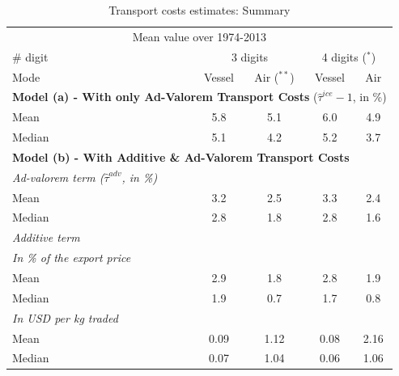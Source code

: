 \documentclass[a4paper,11pt]{article}
\begin{document}
\begin{table}[htbp]
  \centering
  \footnotesize{
  \caption{Transport costs estimates: Summary \label{tab:summary_results}}
  \begin{center}
    \begin{tabular}{l|cc|cc}
      \hline \hline
    \multicolumn{5}{c}{Mean value over 1974-2013}   \\
    \# digit & \multicolumn{2}{c}{3 digits} & \multicolumn{2}{c}{4 digits ($^\ast$)} \\ \hline
    Mode  & Vessel & Air ($^{\ast \ast}$) & Vessel & Air \\ \hline
    \multicolumn{5}{l}{\textbf{Model (a) - With only Ad-Valorem Transport Costs} ($\widehat{\tau}^{ice} -1$, in \%)}  \\ \hline
    Mean  & 5.8 & 5.1 & 6.0 & 4.9 \\
    Median & 5.1 & 4.2 & 5.2 & 3.7 \\ \hline
    \multicolumn{5}{l}{\textbf{Model (b) - With Additive \& Ad-Valorem Transport Costs} } \\ \hline
   \textit{Ad-valorem term ($\widehat{\tau}^{adv}$, in \%)} & & & & \\ \hline
    Mean  & 3.2 & 2.5 & 3.3 & 2.4 \\
    Median & 2.8 & 1.8 & 2.8 & 1.6 \\ \hline
    \textit{Additive term }& & & &   \\ \hline
    \textit{In \% of the export price} &&&& \\ \hline
        Mean  & 2.9 & 1.8 & 2.8 & 1.9 \\
    Median & 1.9 & 0.7 & 1.7 & 0.8 \\ \hline
   \textit{ In USD per kg traded }&&&& \\ \hline
    Mean & 0.09	&1.12	&0.08&	2.16 \\
    Median & 0.07	&1.04	&0.06&	1.06 \\ \hline

\end{tabular}
\end{center}}
\end{table}
\end{document}

